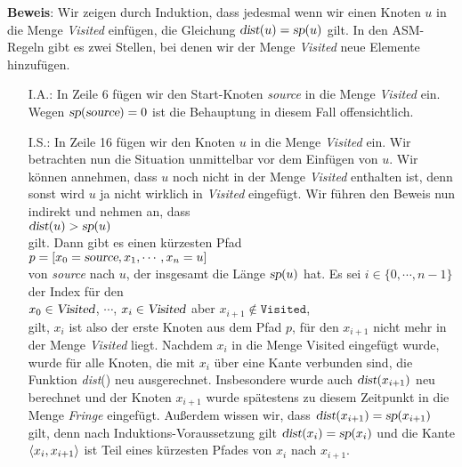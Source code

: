 \noindent
\textbf{Beweis}: Wir zeigen durch Induktion, dass jedesmal wenn wir einen Knoten $u$ in die Menge
\textsl{Visited} einf\"ugen, die Gleichung $\textsl{dist}(u) = \textsl{sp}(u)$ gilt.
In den ASM-Regeln gibt es zwei Stellen, bei denen wir der Menge \textsl{Visited} neue
Elemente hinzuf\"ugen.
\begin{enumerate}
\item[I.A.:]
      In Zeile 6 f\"ugen wir den Start-Knoten \textsl{source} in die Menge \textsl{Visited}
      ein.  Wegen $\textsl{sp}(\textsl{source}) = 0$ ist die Behauptung in diesem Fall
      offensichtlich.
\item[I.S.:]
      In Zeile 16 f\"ugen wir den Knoten $u$ in die Menge \textsl{Visited} ein.
      Wir betrachten nun die Situation unmittelbar vor dem Einf\"ugen von $u$.
      Wir k\"onnen annehmen, dass $u$ noch nicht in der Menge \textsl{Visited}
      enthalten ist, denn sonst wird $u$  ja nicht wirklich in \textsl{Visited} eingef\"ugt.
      Wir f\"uhren den Beweis nun indirekt und nehmen an, dass 
      \\[0.2cm]
      \hspace*{1.3cm} $\textsl{dist}(u) > \textsl{sp}(u)$
      \\[0.2cm]
      gilt.  Dann gibt es einen k\"urzesten Pfad 
      \\[0.2cm]
      \hspace*{1.3cm} $p = [ x_0 = \textsl{source}, x_1, \cdots, x_n = u ]$
      \\[0.2cm]
      von \textsl{source} nach $u$, der insgesamt die L\"ange $\textsl{sp}(u)$ hat.
      Es sei  $i\in\{0,\cdots,n-1\}$ der Index f\"ur den 
      \\[0.2cm]
      \hspace*{1.3cm}
      $x_0\in \textsl{Visited}$, $\cdots$, $x_i\in \textsl{Visited}$ \quad aber \quad $x_{i+1} \not\in \mathtt{Visited}$,
      \\[0.2cm]
      gilt, $x_i$ ist also der erste Knoten aus dem Pfad $p$, f\"ur den $x_{i+1}$ nicht mehr
      in der Menge
      \textsl{Visited} liegt.  Nachdem $x_i$ in die Menge Visited eingef\"ugt wurde,
      wurde f\"ur alle Knoten, die mit $x_i$ \"uber eine Kante verbunden sind,
      die Funktion \textsl{dist}() neu ausgerechnet.  Insbesondere
      wurde auch $\textsl{dist}(x_{i+1})$ neu berechnet und der Knoten $x_{i+1}$ wurde 
      sp\"atestens zu diesem Zeitpunkt in die Menge \textsl{Fringe} eingef\"ugt.
      Au{\ss}erdem wissen wir, dass $\textsl{dist}(x_{i+1}) = \textsl{sp}(x_{i+1})$ gilt,
      denn nach Induktions-Voraussetzung gilt $\textsl{dist}(x_i) = \textsl{sp}(x_i)$
      und die Kante $\pair(x_i,x_{i+1})$ ist Teil eines k\"urzesten Pfades von $x_i$ nach $x_{i+1}$.
      

\end{enumerate}
